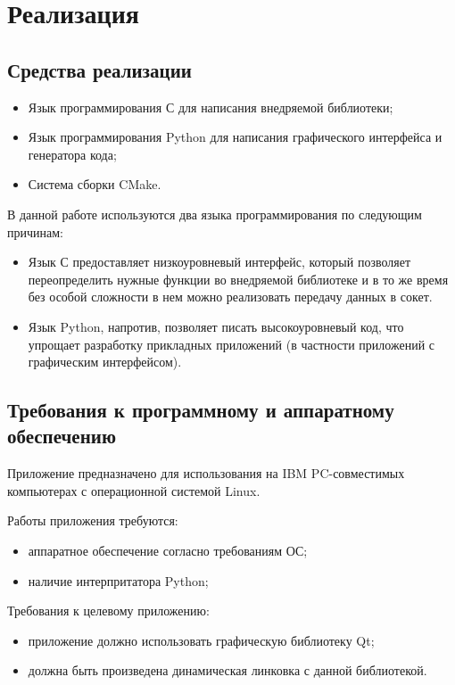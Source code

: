 \chapter{Реализация}

\section{Средства реализации}

\begin{itemize}
	\item Язык программирования С для написания внедряемой библиотеки;
	\item Язык программирования Python для написания графического интерфейса и
		генератора кода;
	\item Система сборки CMake.
\end{itemize}

В данной работе используются два языка программирования по следующим причинам:

\begin{itemize}
	\item Язык С предоставляет низкоуровневый интерфейс, который позволяет
		переопределить нужные функции во внедряемой библиотеке и в то же время
		без особой сложности в нем можно реализовать передачу данных в сокет.
	\item Язык Python, напротив, позволяет писать высокоуровневый код, что
		упрощает разработку прикладных приложений (в частности приложений с
		графическим интерфейсом).
\end{itemize}

\section{Требования к программному и аппаратному обеспечению}

Приложение предназначено для использования на IBM PC-совместимых компьютерах с
операционной системой Linux.

Работы приложения требуются:

\begin{itemize}
	\item аппаратное обеспечение согласно требованиям ОС;
	\item наличие интерпритатора Python;
\end{itemize}

Требования к целевому приложению:

\begin{itemize}
	\item приложение должно использовать графическую библиотеку Qt;
	\item должна быть произведена динамическая линковка с данной библиотекой.
\end{itemize}
